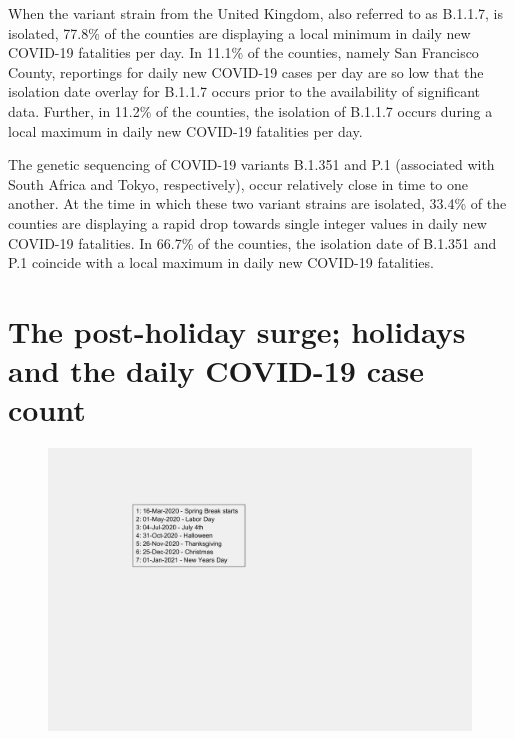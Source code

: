 \documentclass[]{article}
\begin{document}
\indent When the variant strain from the United Kingdom, also referred to as B.1.1.7, is isolated, 77.8\% of the counties are displaying a local minimum in daily new COVID-19 fatalities per day. In 11.1\% of the counties, namely San Francisco County, reportings for daily new COVID-19 cases per day are so low that the isolation date overlay for B.1.1.7 occurs prior to the availability of significant data. Further, in 11.2\% of the counties, the isolation of B.1.1.7 occurs during a local maximum in daily new COVID-19 fatalities per day. 

\indent The genetic sequencing of COVID-19 variants B.1.351 and P.1 (associated with South Africa and Tokyo, respectively), occur relatively close in time to one another. At the time in which these two variant strains are isolated, 33.4\% of the counties are displaying a rapid drop towards single integer values in daily new COVID-19 fatalities. In 66.7\% of the counties, the isolation date of B.1.351 and P.1 coincide with a local maximum in daily new COVID-19 fatalities. 

 
\FloatBarrier
\vspace{5mm}

\section*{The post-holiday surge; holidays and the daily COVID-19 case count}

\begin{figure}[!h]
	\includegraphics[width=\linewidth]{legends/holiday_legend.png}
	\caption{}
	\label{fig:legends/holiday_legendLabel}
\end{figure}
\end{document}
